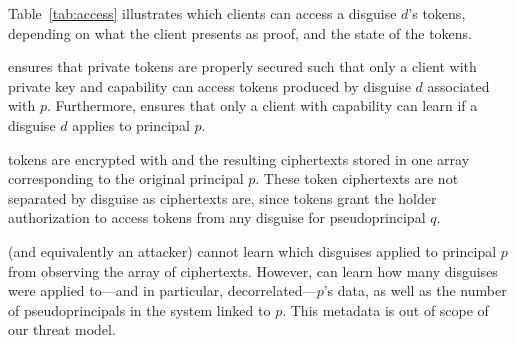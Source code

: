 Table~\ref{tab:access} illustrates which clients can access a disguise $d$'s tokens, depending on
what the client presents as proof, and the state of the tokens.

\sys ensures that private tokens are properly secured such that only a client with private key
 and capability  can access tokens produced by disguise $d$ associated with $p$.
%
Furthermore, \sys ensures that only a client with capability  can learn if a disguise $d$
applies to principal $p$.

 tokens are encrypted with  and the resulting ciphertexts stored in one array
corresponding to the original principal $p$. These token ciphertexts are not separated by disguise
as  ciphertexts are, since  tokens grant the holder authorization to access
tokens from any disguise for pseudoprincipal $q$.

\sys (and equivalently an attacker) cannot learn which disguises applied to principal $p$ from
observing the array of  ciphertexts. However, \sys can learn how many disguises were
applied to---and in particular, decorrelated---$p$'s data, as well as the number of pseudoprincipals
in the system linked to $p$. This metadata is out of scope of our threat model.
\fi

